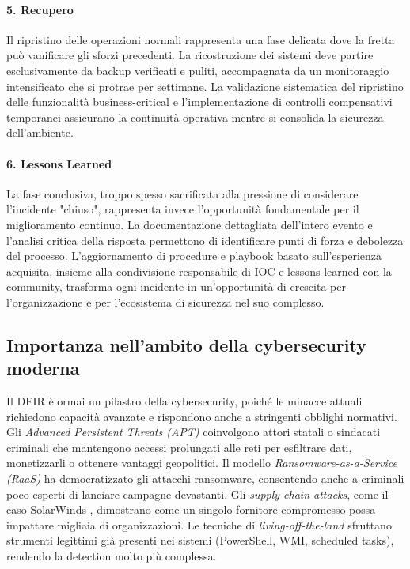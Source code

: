 \paragraph{5. Recupero}
Il ripristino delle operazioni normali rappresenta una fase delicata dove la fretta può vanificare gli sforzi precedenti. La ricostruzione dei sistemi deve partire esclusivamente da backup verificati e puliti, accompagnata da un monitoraggio intensificato che si protrae per settimane. La validazione sistematica del ripristino delle funzionalità business-critical e l'implementazione di controlli compensativi temporanei assicurano la continuità operativa mentre si consolida la sicurezza dell'ambiente.

\paragraph{6. Lessons Learned}
La fase conclusiva, troppo spesso sacrificata alla pressione di considerare l'incidente "chiuso", rappresenta invece l'opportunità fondamentale per il miglioramento continuo. La documentazione dettagliata dell'intero evento e l'analisi critica della risposta permettono di identificare punti di forza e debolezza del processo. L'aggiornamento di procedure e playbook basato sull'esperienza acquisita, insieme alla condivisione responsabile di IOC e lessons learned con la community, trasforma ogni incidente in un'opportunità di crescita per l'organizzazione e per l'ecosistema di sicurezza nel suo complesso.

\subsection{Importanza nell'ambito della cybersecurity moderna}

Il DFIR è ormai un pilastro della cybersecurity, poiché le minacce attuali richiedono capacità avanzate e rispondono anche a stringenti obblighi normativi. Gli \textit{Advanced Persistent Threats (APT)} coinvolgono attori statali o sindacati criminali che mantengono accessi prolungati alle reti per esfiltrare dati, monetizzarli o ottenere vantaggi geopolitici. Il modello \textit{Ransomware-as-a-Service (RaaS)} ha democratizzato gli attacchi ransomware, consentendo anche a criminali poco esperti di lanciare campagne devastanti. Gli \textit{supply chain attacks}, come il caso SolarWinds \cite{solarwinds2020}, dimostrano come un singolo fornitore compromesso possa impattare migliaia di organizzazioni. Le tecniche di \textit{living-off-the-land} sfruttano strumenti legittimi già presenti nei sistemi (PowerShell, WMI, scheduled tasks), rendendo la detection molto più complessa.

